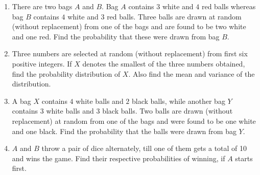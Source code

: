 \begin{enumerate}
	\item There are two bags $A$ and $B$. Bag $A$ contains $3$ white and $4$ red balls whereas bag $B$ contains $4$ white and $3$ red balls. Three balls are drawn at random (without replacement) from one of the bags and are found to be two white and one red. Find the probability that these were drawn from bag $B$.

	\item Three numbers are selected at random (without replacement) from first six positive integers. If $X$ denotes the smallest of the three numbers obtained, find the probability distribution of $X$. Also find the mean and variance of the distribution.


	\item A bag $X$ contains $4$ white balls and $2$ black balls, while another bag $Y$ contains
$3$ white balls and $3$ black balls. Two balls are drawn (without replacement) at
random from one of the bags and were found to be one white and one black.
Find the probability that the balls were drawn from bag $Y$.

	\item $A$ and $B$ throw a pair of dice alternately, till one of them gets a total of 10 and
wins the game. Find their respective probabilities of winning, if $A$ starts first.


\end{enumerate}
